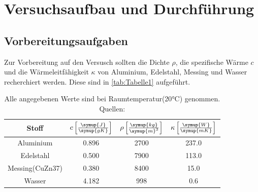 \section{Versuchsaufbau und Durchführung}
\label{sec:Durchführung}
\subsection{Vorbereitungsaufgaben}
\label{subsec:Aufgaben}
Zur Vorbereitung auf den Versusch sollten die Dichte $\rho$, die spezifische Wärme $c$ und
die Wärmeleitfähigkeit $\kappa$ von Aluminium, Edelstahl, Messing und Wasser recherchiert werden.
Diese sind in \autoref{tab:Tabelle1} aufgeführt.
\begin{table}[H]
    \centering
    \caption{Alle angegebenen Werte sind bei Raumtemperatur(20$\unit{\celsius}$) genommen. \\Quellen: }
    \label{tab:Tabelle1}
    \begin{tabular}{cccc}
        \toprule
        Stoff&
        {$c \left[\frac{\symup{J}}{\symup{gK}}\right]$} &
        {$\rho \left[\frac{\symup{kg}}{\symup{m}^3}\right]$} &
        {$\kappa \left[\frac{\symup{W}}{\symup{mK}}\right]$} \\
        \midrule
        Aluminium & 0.896 & 2700 & 237.0 \\
        Edelstahl & 0.500 & 7900 & 113.0 \\
        Messing(CuZn37) & 0.380 & 8400 & 15.0 \\
        Wasser & 4.182 & 998 & 0.6 \\
        \bottomrule
    \end{tabular}
\end{table}
